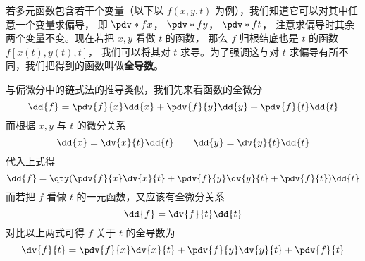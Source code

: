 

若多元函数包含若干个变量（以下以 $f(x,y,t)$ 为例），我们知道它可以对其中任意一个变量求偏导， 即 $\pdv*{f}{x}$，  $\pdv*{f}{y}$，  $\pdv*{f}{t}$， 注意求偏导时其余两个变量不变。现在若把 $x,y$ 看做 $t$ 的函数， 那么 $f$ 归根结底也是 $t$ 的函数 $f[x(t),y(t),t]$， 我们可以将其对 $t$ 求导。为了强调这与对 $t$ 求偏导有所不同，我们把得到的函数叫做\textbf{全导数}。

与偏微分中的链式法的推导类似，我们先来看函数的全微分
\begin{equation}
\dd{f} = \pdv{f}{x} \dd{x} + \pdv{f}{y} \dd{y} + \pdv{f}{t} \dd{t}
\end{equation}
而根据 $x,y$ 与 $t$ 的微分关系
\begin{equation}
\dd{x} = \dv{x}{t} \dd{t} \qquad  \dd{y} = \dv{y}{t} \dd{t}
\end{equation}
代入上式得
\begin{equation}
\dd{f} = \qty( \pdv{f}{x}\dv{x}{t} + \pdv{f}{y}\dv{y}{t} + \pdv{f}{t} )\dd{t}
\end{equation}
而若把 $f$ 看做 $t$ 的一元函数，又应该有全微分关系
\begin{equation}
\dd{f} = \dv{f}{t} \dd{t}
\end{equation}
对比以上两式可得 $f$ 关于 $t$ 的全导数为
\begin{equation}\label{TotDer_eq1}
\dv{f}{t} = \pdv{f}{x}\dv{x}{t} + \pdv{f}{y}\dv{y}{t} + \pdv{f}{t}
\end{equation}

